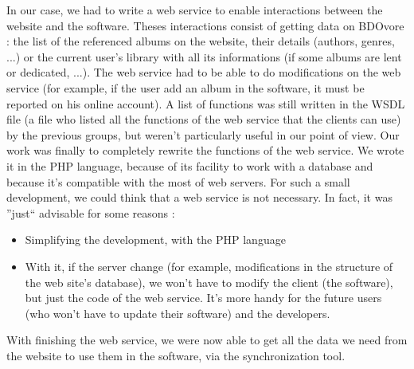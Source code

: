 \documentclass[11pt]{report} %
\begin{document}
In our case, we had to write a web service to enable interactions between the website and the software. Theses interactions consist of getting data on BDOvore : the list of the referenced albums on the website, their details (authors, genres, ...) or the current user's library with all its informations (if some albums are lent or dedicated, ...). The web service had to be able to do modifications on the web service (for example, if the user add an album in the software, it must be reported on his online account).
\newline A list of functions was still written in the WSDL file (a file who listed all the functions of the web service that the clients can use) by the previous groups, but weren't particularly useful in our point of view.
\newline Our work was finally to completely rewrite the functions of the web service. We wrote it in the PHP language, because of its facility to work with a database and because it's compatible with the most of web servers.
\newline For such a small development, we could think that a web service is not necessary. In fact, it was ''just`` advisable for some reasons :

\begin{itemize}
\item Simplifying the development, with the PHP language 
\item With it, if the server change (for example, modifications in the structure of the web site's database), we won't have to modify the client (the software), but just the code of the web service. It's more handy for the future users (who won't have to update their software) and the developers. 
\end{itemize}

With finishing the web service, we were now able to get all the data we need from the website to use them in the software, via the synchronization tool.
\end{document}
